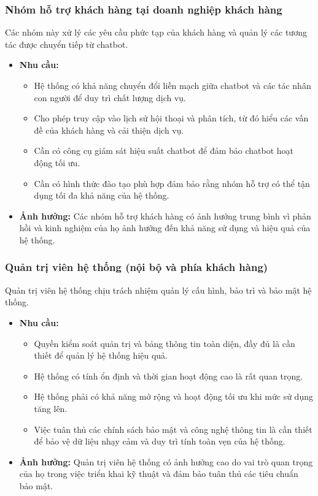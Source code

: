 \subsubsection{Nhóm hỗ trợ khách hàng tại doanh nghiệp khách hàng}

Các nhóm này xử lý các yêu cầu phức tạp của khách hàng và quản lý các tương tác được chuyển tiếp từ chatbot.

\begin{itemize}
    \item \textbf{Nhu cầu:}
    \begin{itemize}
        \item Hệ thống có khả năng chuyển đổi liền mạch giữa chatbot và các tác nhân con người để duy trì chất lượng dịch vụ.
        \item Cho phép truy cập vào lịch sử hội thoại và phân tích, từ đó hiểu các vấn đề của khách hàng và cải thiện dịch vụ.
        \item Cần có công cụ giám sát hiệu suất chatbot để đảm bảo chatbot hoạt động tối ưu.
        \item Cần có hình thức đào tạo phù hợp đảm bảo rằng nhóm hỗ trợ có thể tận dụng tối đa khả năng của hệ thống.
    \end{itemize}
    \item \textbf{Ảnh hưởng:} Các nhóm hỗ trợ khách hàng có ảnh hưởng trung bình vì phản hồi và kinh nghiệm của họ ảnh hưởng đến khả năng sử dụng và hiệu quả của hệ thống.
\end{itemize}

\subsubsection{Quản trị viên hệ thống (nội bộ và phía khách hàng)}

Quản trị viên hệ thống chịu trách nhiệm quản lý cấu hình, bảo trì và bảo mật hệ thống.

\begin{itemize}
    \item \textbf{Nhu cầu:}
    \begin{itemize}
        \item Quyền kiểm soát quản trị và bảng thông tin toàn diện, đầy đủ là cần thiết để quản lý hệ thống hiệu quả.
        \item Hệ thống có tính ổn định và thời gian hoạt động cao là rất quan trọng.
        \item Hệ thống phải có khả năng mở rộng và hoạt động tối ưu khi mức sử dụng tăng lên.
        \item Việc tuân thủ các chính sách bảo mật và công nghệ thông tin là cần thiết để bảo vệ dữ liệu nhạy cảm và duy trì tính toàn vẹn của hệ thống.
    \end{itemize}
    \item \textbf{Ảnh hưởng:} Quản trị viên hệ thống có ảnh hưởng cao do vai trò quan trọng của họ trong việc triển khai kỹ thuật và đảm bảo tuân thủ các tiêu chuẩn bảo mật.
\end{itemize}

